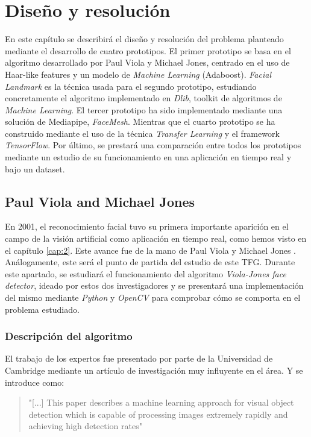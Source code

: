 
\chapter{Diseño y resolución}
\vspace{-1cm}

En este capítulo se describirá el diseño y resolución del problema planteado mediante el desarrollo de cuatro prototipos. El primer prototipo se basa en el algoritmo desarrollado por Paul Viola y Michael Jones, centrado en el uso de Haar-like features y un modelo de \textit{Machine Learning} (Adaboost). \textit{Facial Landmark} es la técnica usada para el segundo prototipo, estudiando concretamente el algoritmo implementado en \textit{Dlib}, toolkit de algoritmos de \textit{Machine Learning}. El tercer prototipo ha sido implementado mediante una solución de Mediapipe, \textit{FaceMesh}. Mientras que el cuarto prototipo se ha construido mediante el uso de la técnica \textit{Transfer Learning} y el framework \textit{TensorFlow}. Por último, se prestará una comparación entre todos los prototipos mediante un estudio de su funcionamiento en una aplicación en tiempo real y bajo un dataset.

\vspace{-1cm}
\section{Paul Viola and Michael Jones} \label{haar-like}
\vspace{-0.7cm}

En 2001, el reconocimiento facial tuvo su primera importante aparición en el campo de la visión artificial como aplicación en tiempo real, como hemos visto en el capítulo \ref{cap:2}. Este avance fue de la mano de Paul Viola y Michael Jones \cite{paulViola}. Análogamente, este será el punto de partida del estudio de este TFG. Durante este apartado, se estudiará el funcionamiento del algoritmo \textit{Viola-Jones face detector}, ideado por estos dos investigadores y se presentará una implementación del mismo mediante \textit{Python} y \textit{OpenCV} para comprobar cómo se comporta en el problema estudiado.

\subsection*{Descripción del algoritmo}
\vspace{-0.7cm}
El trabajo de los expertos fue presentado por parte de la Universidad de Cambridge mediante un artículo de investigación muy influyente en el área. Y se introduce como: 
\begin{quote}
	"[...] This paper describes a machine learning approach for visual object detection which is capable of processing images extremely rapidly and achieving high detection rates" \vspace{0.4mm} \cite{paulViola}
\end{quote}

